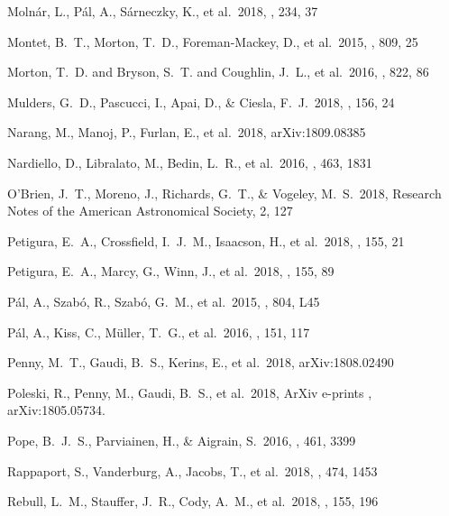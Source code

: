 \documentclass[modern]{aastex62}
\begin{document}
\begin{thebibliography}{}
 Moln{\'a}r, L., P{\'a}l, A., S{\'a}rneczky, K., et al.\ 2018, \apjs, 234, 37 

 Montet, B.~T., Morton, T.~D., Foreman-Mackey, D., et al.\ 2015, \apj, 809, 25 

 Morton, T.~D. and Bryson, S.~T. and Coughlin, J.~L., et al.\ 2016, \apj, 822, 86 

 Mulders, G.~D., Pascucci, I., Apai, D., \& Ciesla, F.~J.\ 2018, \aj, 156, 24

 Narang, M., Manoj, P., Furlan, E., et al.\ 2018, arXiv:1809.08385 

 Nardiello, D., Libralato, M., Bedin, L.~R., et al.\ 2016, \mnras, 463, 1831

 O'Brien, J.~T., Moreno, J., Richards, G.~T., \& Vogeley, M.~S.\ 2018, Research Notes of the American Astronomical Society, 2, 127 

 Petigura, E.~A., Crossfield, I.~J.~M., Isaacson, H., et al.\ 2018, \aj, 155, 21 

 Petigura, E.~A., Marcy, G., Winn, J., et al.\ 2018, \aj, 155, 89

 P{\'a}l, A., Szab{\'o}, R., Szab{\'o}, G.~M., et al.\ 2015, \apjl, 804, L45 

 P{\'a}l, A., Kiss, C., M{\"u}ller, T.~G., et al.\ 2016, \aj, 151, 117 

 Penny, M.~T., Gaudi, B.~S., Kerins, E., et al.\ 2018, arXiv:1808.02490 

 Poleski, R., Penny, M., Gaudi, B.~S., et al.\ 2018, ArXiv e-prints , arXiv:1805.05734.

 Pope, B.~J.~S., Parviainen, H., \& Aigrain, S.\ 2016, \mnras, 461, 3399 

 Rappaport, S., Vanderburg, A., Jacobs, T., et al.\ 2018, \mnras, 474, 1453 

 Rebull, L.~M., Stauffer, J.~R., Cody, A.~M., et al.\ 2018, \aj, 155, 196 


\end{thebibliography}
\end{document}
